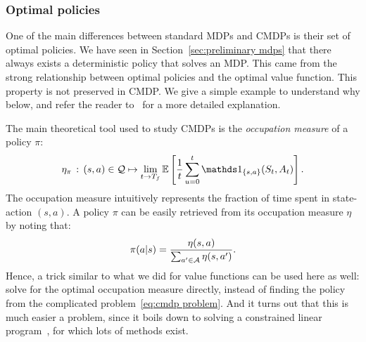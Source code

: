 		\subsubsection{Optimal policies}
		One of the main differences between standard MDPs and CMDPs is their set of optimal policies. We have seen in Section~\ref{sec:preliminary mdps} that there always exists a deterministic policy that solves an MDP. This came from the strong relationship between optimal policies and the optimal value function. This property is not preserved in CMDP. We give a simple example to understand why below, and refer the reader to~\cite{altman1999constrained} for a more detailed explanation.\par
		The main theoretical tool used to study CMDPs is the\emph{ occupation measure} of a policy $\pi$:
		\begin{equation}
			\eta_\pi\,:\,(s, a)\in\Q\mapsto \lim_{t\to\Tf}\expected\left[\frac{1}{t}\sum_{u=0}^t\indicator_{\{s, a\}}(S_t, A_t)\right].
		\end{equation}
		The occupation measure intuitively represents the fraction of time spent in state-action $(s, a)$. A policy $\pi$ can be easily retrieved from its occupation measure $\eta$ by noting that:
		\begin{equation}
			\pi(a|s) = \frac{\eta(s, a)}{\sum_{a'\in\mathcal{A}}\eta(s, a')}.
		\end{equation}
		Hence, a trick similar to what we did for value functions can be used here as well: solve for the optimal occupation measure directly, instead of finding the policy from the complicated problem~\eqref{eq:cmdp problem}. And it turns out that this is much easier a problem, since it boils down to solving a constrained linear program~\cite[Theorem\,3.3]{altman1999constrained}, for which lots of methods exist.
		
